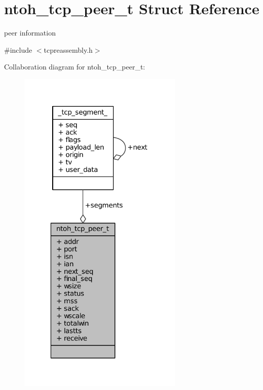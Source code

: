 \hypertarget{structntoh__tcp__peer__t}{\section{ntoh\-\_\-tcp\-\_\-peer\-\_\-t Struct Reference}
\label{structntoh__tcp__peer__t}
}


peer information  




{\ttfamily \#include $<$tcpreassembly.\-h$>$}



Collaboration diagram for ntoh\-\_\-tcp\-\_\-peer\-\_\-t\-:
\nopagebreak
\begin{figure}[H]
\begin{center}
\leavevmode
\includegraphics[width=223pt]{structntoh__tcp__peer__t__coll__graph}
\end{center}
\end{figure}
